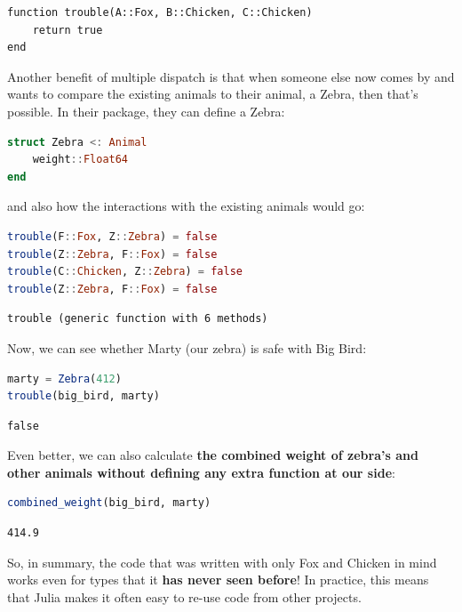 \documentclass[
  notoc %
]{tufte-book}
\begin{document}
\begin{lstlisting}
function trouble(A::Fox, B::Chicken, C::Chicken)
    return true
end
\end{lstlisting}

Another benefit of multiple dispatch is that when someone else now comes
by and wants to compare the existing animals to their animal, a Zebra,
then that's possible. In their package, they can define a Zebra:

\begin{lstlisting}[language=Julia]
struct Zebra <: Animal
    weight::Float64
end
\end{lstlisting}

and also how the interactions with the existing animals would go:

\begin{lstlisting}[language=Julia]
trouble(F::Fox, Z::Zebra) = false
trouble(Z::Zebra, F::Fox) = false
trouble(C::Chicken, Z::Zebra) = false
trouble(Z::Zebra, F::Fox) = false
\end{lstlisting}

\begin{lstlisting}[language=Output]
trouble (generic function with 6 methods)
\end{lstlisting}

Now, we can see whether Marty (our zebra) is safe with Big Bird:

\begin{lstlisting}[language=Julia]
marty = Zebra(412)
trouble(big_bird, marty)
\end{lstlisting}

\begin{lstlisting}[language=Output]
false
\end{lstlisting}

Even better, we can also calculate \textbf{the combined weight of
zebra's and other animals without defining any extra function at our
side}:

\begin{lstlisting}[language=Julia]
combined_weight(big_bird, marty)
\end{lstlisting}

\begin{lstlisting}[language=Output]
414.9
\end{lstlisting}

So, in summary, the code that was written with only Fox and Chicken in
mind works even for types that it \textbf{has never seen before}! In
practice, this means that Julia makes it often easy to re-use code from
other projects.
\end{document}
